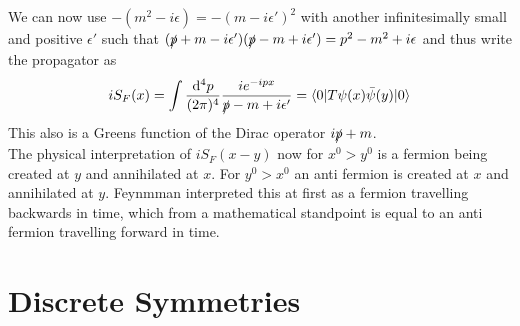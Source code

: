 \documentclass{include/thesisclass}
\newcommand{\rk}{\rangle}
\newcommand{\lk}{\langle}
\newcommand{\dd}{{\rm d}}
\newcommand{\eps}{\epsilon}
\begin{document}
We can now use $-(m^2 - i \eps) = -(m -i \eps')^2$ with another infinitesimally small and positive $\eps'$ such that $( \slashed p + m - i \eps')(\slashed p - m  + i \eps') = p^2 - m^2 + i \eps$ and thus write the propagator as
\[ i S_F(x) = \int \frac{\dd^4 p}{(2\pi)^4} \frac{ i e^{-ipx}}{\slashed p - m + i \eps'} = \lk 0 | T \psi(x) \bar \psi(y) | 0 \rk\]
This also is a Greens function of the Dirac operator $i \slashed p + m$.\\
The physical interpretation of $i S_F(x-y)$ now for $x^0 > y^0$ is a fermion being created at $y$ and annihilated at $x$. For $y^0 > x^0$ an anti fermion is created at $x$ and annihilated at $y$. Feynmman interpreted this at first as a fermion travelling backwards in time, which from a mathematical standpoint is equal to an anti fermion travelling forward in time.

\section{Discrete Symmetries}
\end{document}
